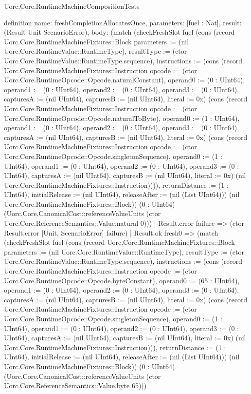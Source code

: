 \begin{lexlean}{Uorc.Core.RuntimeMachineCompositionTests}
\begin{semanticmodule}
definition{
  name: freshCompletionAllocatesOnce,
  parameters: [fuel : Nat],
  result: (Result Unit ScenarioError),
  body: (match (checkFreshSlot fuel (cons (record Uorc.Core.RuntimeMachineFixtures::Block {parameters := (nil Uorc.Core.RuntimeValue::RuntimeType), resultType := (ctor Uorc.Core.RuntimeValue::RuntimeType.sequence), instructions := (cons (record Uorc.Core.RuntimeMachineFixtures::Instruction {opcode := (ctor Uorc.Core.RuntimeOpcode::Opcode.naturalConstant), operand0 := (0 : UInt64), operand1 := (0 : UInt64), operand2 := (0 : UInt64), operand3 := (0 : UInt64), capturesA := (nil UInt64), capturesB := (nil UInt64), literal := 0x}) (cons (record Uorc.Core.RuntimeMachineFixtures::Instruction {opcode := (ctor Uorc.Core.RuntimeOpcode::Opcode.naturalToByte), operand0 := (1 : UInt64), operand1 := (0 : UInt64), operand2 := (0 : UInt64), operand3 := (0 : UInt64), capturesA := (nil UInt64), capturesB := (nil UInt64), literal := 0x}) (cons (record Uorc.Core.RuntimeMachineFixtures::Instruction {opcode := (ctor Uorc.Core.RuntimeOpcode::Opcode.singletonSequence), operand0 := (1 : UInt64), operand1 := (0 : UInt64), operand2 := (0 : UInt64), operand3 := (0 : UInt64), capturesA := (nil UInt64), capturesB := (nil UInt64), literal := 0x}) (nil Uorc.Core.RuntimeMachineFixtures::Instruction)))), returnDistance := (1 : UInt64), initialRelease := (nil UInt64), releaseAfter := (nil (List UInt64))}) (nil Uorc.Core.RuntimeMachineFixtures::Block)) (0 : UInt64) (Uorc.Core.CanonicalCost::referenceValueUnits (ctor Uorc.Core.ReferenceSemantics::Value.natural 0)))
    | Result.error failure => (ctor Result.error [Unit, ScenarioError] failure)
    | Result.ok fresh0 => (match (checkFreshSlot fuel (cons (record Uorc.Core.RuntimeMachineFixtures::Block {parameters := (nil Uorc.Core.RuntimeValue::RuntimeType), resultType := (ctor Uorc.Core.RuntimeValue::RuntimeType.sequence), instructions := (cons (record Uorc.Core.RuntimeMachineFixtures::Instruction {opcode := (ctor Uorc.Core.RuntimeOpcode::Opcode.byteConstant), operand0 := (65 : UInt64), operand1 := (0 : UInt64), operand2 := (0 : UInt64), operand3 := (0 : UInt64), capturesA := (nil UInt64), capturesB := (nil UInt64), literal := 0x}) (cons (record Uorc.Core.RuntimeMachineFixtures::Instruction {opcode := (ctor Uorc.Core.RuntimeOpcode::Opcode.singletonSequence), operand0 := (1 : UInt64), operand1 := (0 : UInt64), operand2 := (0 : UInt64), operand3 := (0 : UInt64), capturesA := (nil UInt64), capturesB := (nil UInt64), literal := 0x}) (nil Uorc.Core.RuntimeMachineFixtures::Instruction))), returnDistance := (1 : UInt64), initialRelease := (nil UInt64), releaseAfter := (nil (List UInt64))}) (nil Uorc.Core.RuntimeMachineFixtures::Block)) (0 : UInt64) (Uorc.Core.CanonicalCost::referenceValueUnits (ctor Uorc.Core.ReferenceSemantics::Value.byte 65)))
}
\end{semanticmodule}
\end{lexlean}
